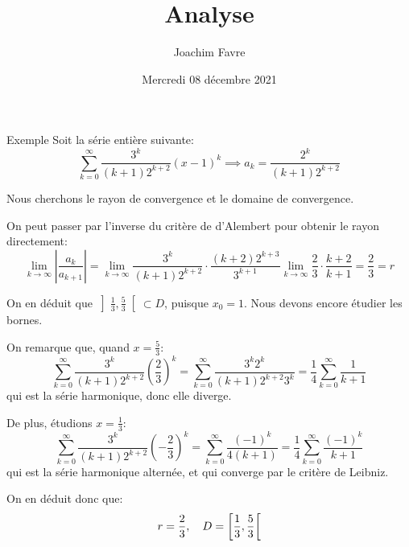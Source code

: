 \documentclass[a4paper]{article}
\title{Analyse}
\author{Joachim Favre}
\date{Mercredi 08 décembre 2021}
\begin{document}
\maketitle


\begin{parag}{Exemple}
    Soit la série entière suivante: 
    \[\sum_{k=0}^{\infty} \frac{3^k}{\left(k+1\right)2^{k+2}}\left(x - 1\right)^k \implies a_k = \frac{2^{k}}{\left(k+1\right)2^{k+2}}\]
    
    Nous cherchons le rayon de convergence et le domaine de convergence.

    On peut passer par l'inverse du critère de d'Alembert pour obtenir le rayon directement: 
    \[\lim_{k \to \infty} \left|\frac{a_k}{a_{k+1}}\right| = \lim_{k \to \infty} \frac{3^{k}}{\left(k+1\right)2^{k+2}}\cdot\frac{\left(k+2\right)2^{k+3}}{3^{k+1}} \lim_{k \to \infty} \frac{2}{3} \cdot \frac{k+2}{k+1} = \frac{2}{3} = r\]
    
    On en déduit que $\left]\frac{1}{3}, \frac{5}{3}\right[ \subset D$, puisque $x_0 = 1$. Nous devons encore étudier les bornes.

    On remarque que, quand $x = \frac{5}{3}$: 
    \[\sum_{k=0}^{\infty} \frac{3^k}{\left(k+1\right)2^{k+2}} \left(\frac{2}{3}\right)^k = \sum_{k=0}^{\infty} \frac{3^k 2^k}{\left(k+1\right)2^{k+2} 3^k} = \frac{1}{4} \sum_{k=0}^{\infty} \frac{1}{k+1}\]
    qui est la série harmonique, donc elle diverge.

    De plus, étudions $x = \frac{1}{3}$: 
    \[\sum_{k=0}^{\infty} \frac{3^k}{\left(k+1\right)2^{k+2}} \left(-\frac{2}{3}\right)^k = \sum_{k=0}^{\infty} \frac{\left(-1\right)^k}{4\left(k+1\right)} = \frac{1}{4} \sum_{k=0}^{\infty} \frac{\left(-1\right)^k}{k+1}\]
    qui est la série harmonique alternée, et qui converge par le critère de Leibniz. 

    On en déduit donc que: 
    \[r = \frac{2}{3}, \mathspace D = \left[\frac{1}{3}, \frac{5}{3}\right[ \]
\end{parag}
\end{document}
